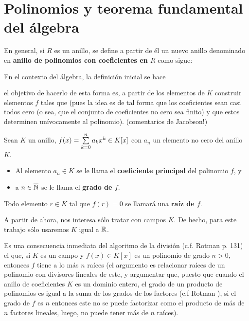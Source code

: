 \section{Polinomios y teorema fundamental del álgebra}

En general, si $R$ es un anillo, se define a partir de 
él un nuevo anillo denominado en \textbf{anillo de polinomios
con coeficientes en $R$} como sigue:


En el contexto del álgebra, la definición inicial se hace

el objetivo de hacerlo de esta forma es, a partir de los
elementos de $K$ construir elementos $f$ tales que
(pues la idea es de tal forma que los coeficientes sean 
casi todos cero (o sea, que el conjunto de coeficientes no cero 
sea finito) y que estos determinen unívocamente al polinomio).
(comentarios de Jacobson!) 

\begin{defi}
Sean $K$ un anillo, $f(x)= \sum\limits_{k=0}^{n}a_{k}x^{k} \in K[x]$
con $a_{n}$ un elemento no cero del anillo $K$.
\begin{itemize}
\item Al elemento $a_{n} \in K$ se le llama el \textbf{coeficiente
principal} del polinomio $f$, y
\item a $n \in \overline{\mathbb{N}}$ se le llama el \textbf{grado de $f$}.
\end{itemize}
Todo elemento $r \in K$ tal que $f(r)=0$ se llamará 
una \textbf{raíz de $f$}. 
\end{defi}


A partir de ahora, nos interesa sólo tratar con 
campos $K$. De hecho, para este trabajo
sólo usaremos $K$ igual a $\mathbb{R}$.


Es una consecuencia inmediata del algoritmo de la división
(c.f. Rotman p. 131) el que, si $K$ es un campo
y $f(x) \in K[x]$ es un polinomio de grado $n>0$, 
entonces $f$ tiene a lo más $n$ raíces (el argumento es
relacionar raíces de un polinomio con divisores lineales
de este, y argumentar que, puesto que cuando el anillo de
coeficientes $K$ es un dominio entero, el grado de un 
producto de polinomios es igual a la suma de los grados de los
factores (c.f Rotman ), si el grado de $f$
es $n$ entonces este no se puede factorizar como el producto
de más de $n$ factores lineales, luego, no puede tener más de 
$n$ raíces).

